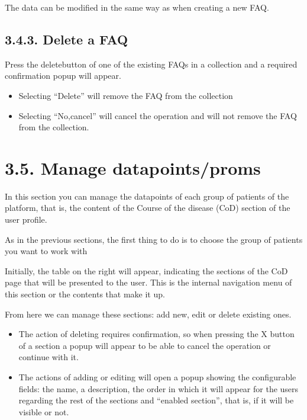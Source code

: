 \documentclass[letterpaper,10pt,english]{sphinxmanual}
\begin{document}
The data can be modified in the same way as when creating a new FAQ.


\subsection{3.4.3. Delete a FAQ}
\label{\detokenize{pages/Superadmin profile:delete-a-faq}}
Press the deletebutton of one of the existing FAQs in a collection and a required confirmation popup will appear.
\begin{itemize}
\item {} 
Selecting “Delete” will remove the FAQ from the collection

\item {} 
Selecting “No,cancel” will cancel the operation and will not remove the FAQ from the collection.

\end{itemize}


\section{3.5. Manage datapoints/proms}
\label{\detokenize{pages/Superadmin profile:manage-datapoints-proms}}


In this section you can manage the datapoints of each group of patients of the platform, that is, the content of the Course of the disease (CoD) section of the user profile.

As in the previous sections, the first thing to do is to choose the group of patients you want to work with



Initially, the table on the right will appear, indicating the sections of the CoD page that will be presented to the user. This is the internal navigation menu of this section or the contents that make it up.

From here we can manage these sections: add new, edit or delete existing ones.
\begin{itemize}
\item {} 
The action of deleting requires confirmation, so when pressing the X button of a section a popup will appear to be able to cancel the operation or continue with it.

\item {} 
The actions of adding or editing will open a popup showing the configurable fields: the name, a description, the order in which it will appear for the users regarding the rest of the sections and “enabled section”, that is, if it will be visible or not.

\end{itemize}
\end{document}
